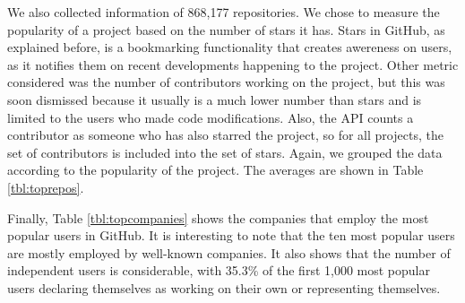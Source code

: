 We also collected information of 868,177 repositories. We chose to measure the popularity of a project based on the number of stars it has. Stars in GitHub, as explained before, is a bookmarking functionality that creates awereness on users, as it notifies them on recent developments happening to the project. Other metric considered was the number of contributors working on the project, but this was soon dismissed because it usually is a much lower number than stars and is limited to the users who made code modifications. Also, the API counts a contributor as someone who has also starred the project, so for all projects, the set of contributors is included into the set of stars. Again, we grouped the data according to the popularity of the project. The averages are shown in Table \ref{tbl:toprepos}.

Finally, Table \ref{tbl:topcompanies} shows the companies that employ the most popular users in GitHub. It is interesting to note that the ten most popular users are mostly employed by well-known companies. It also shows that the number of independent users is considerable, with 35.3\% of the first 1,000 most popular users declaring themselves as working on their own or representing themselves.

